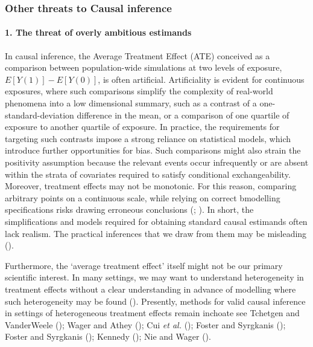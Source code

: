 \documentclass[
  singlecolumn]{article}
\let\oldparagraph\paragraph
\renewcommand{\paragraph}[1]{\oldparagraph{#1}\mbox{}}
\begin{document}
\subsubsection{Other threats to Causal
inference}\label{other-threats-to-causal-inference}

\paragraph{1. The threat of overly ambitious
estimands}\label{the-threat-of-overly-ambitious-estimands}

In causal inference, the Average Treatment Effect (ATE) conceived as a
comparison between population-wide simulations at two levels of
exposure, \(E[Y(1)] - E[Y(0)]\), is often artificial. Artificiality is
evident for continuous exposures, where such comparisons simplify the
complexity of real-world phenomena into a low dimensional summary, such
as a contrast of a one-standard-deviation difference in the mean, or a
comparison of one quartile of exposure to another quartile of exposure.
In practice, the requirements for targeting such contrasts impose a
strong reliance on statistical models, which introduce further
opportunities for bias. Such comparisons might also strain the
positivity assumption because the relevant events occur infrequently or
are absent within the strata of covariates required to satisfy
conditional exchangeability. Moreover, treatment effects may not be
monotonic. For this reason, comparing arbitrary points on a continuous
scale, while relying on correct bmodelling specifications risks drawing
erroneous conclusions (; ). In
short, the simplifications and models required for obtaining standard
causal estimands often lack realism. The practical inferences that we
draw from them may be misleading
().

Furthermore, the `average treatment effect' itself might not be our
primary scientific interest. In many settings, we may want to understand
heterogeneity in treatment effects without a clear understanding in
advance of modelling where such heterogeneity may be found
(). Presently, methods for
valid causal inference in settings of heterogeneous treatment effects
remain inchoate see Tchetgen and VanderWeele
(); Wager and Athey
(); Cui \emph{et al.}
(); Foster and Syrgkanis
(); Foster and Syrgkanis
(); Kennedy
(); Nie and Wager
().
\end{document}
